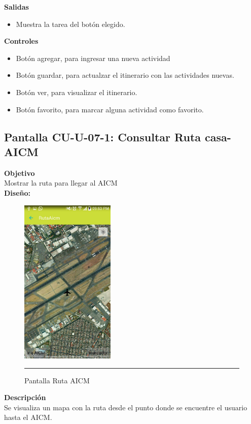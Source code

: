 \textbf{Salidas}
\begin{itemize}
\item Muestra la tarea del botón elegido.
\end{itemize}

\textbf{Controles}
\begin{itemize}
\item Botón agregar, para ingresar una nueva actividad
\item Botón guardar, para actualzar el itinerario con las actividades nuevas.
\item Botón ver, para visualizar el itinerario.
\item Botón favorito, para marcar alguna actividad como favorito.
\end{itemize}
\clearpage
\hypertarget{CU-U-07-1}{}
\subsection{Pantalla CU-U-07-1: Consultar Ruta casa-AICM}
\textbf{Objetivo}\\
Mostrar la ruta para llegar al AICM \\

\textbf{Diseño:}
\begin{figure}[h]
	\centering
		\includegraphics[width=0.4\textwidth]{Figuras/intRutaAICM.jpg}
		\rule{30em}{0.5pt}
	\caption[Pantalla Ruta AICM]{Pantalla Ruta AICM}
	\label{fig:intRutaAICM}
\end{figure}

\textbf{Descripción} \\
Se visualiza un mapa con la ruta desde el punto donde se encuentre el usuario hasta el AICM. \\


